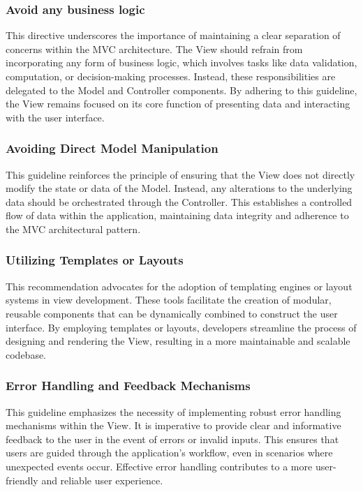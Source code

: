 \subsubsection{Avoid any business logic}
This directive underscores the importance of maintaining a clear separation of concerns within the MVC architecture. The View should refrain from incorporating any form of business logic, which involves tasks like data validation, computation, or decision-making processes. Instead, these responsibilities are delegated to the Model and Controller components. By adhering to this guideline, the View remains focused on its core function of presenting data and interacting with the user interface.

\subsubsection{Avoiding Direct Model Manipulation}
This guideline reinforces the principle of ensuring that the View does not directly modify the state or data of the Model. Instead, any alterations to the underlying data should be orchestrated through the Controller. This establishes a controlled flow of data within the application, maintaining data integrity and adherence to the MVC architectural pattern.

\subsubsection{Utilizing Templates or Layouts}
This recommendation advocates for the adoption of templating engines or layout systems in view development. These tools facilitate the creation of modular, reusable components that can be dynamically combined to construct the user interface. By employing templates or layouts, developers streamline the process of designing and rendering the View, resulting in a more maintainable and scalable codebase.

\subsubsection{Error Handling and Feedback Mechanisms}
This guideline emphasizes the necessity of implementing robust error handling mechanisms within the View. It is imperative to provide clear and informative feedback to the user in the event of errors or invalid inputs. This ensures that users are guided through the application's workflow, even in scenarios where unexpected events occur. Effective error handling contributes to a more user-friendly and reliable user experience.

